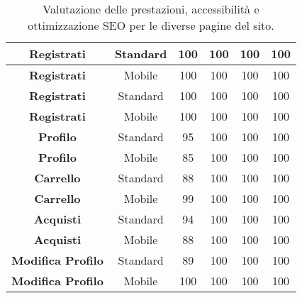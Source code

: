 \begin{table}[H]
\begin{tabular}{|c|c|c|c|c|c|}
        \hline
        \textbf{Registrati} & Standard & 100 & 100 & 100 & 100 \\ 
        \hline
        \rowcolor[gray]{0.9}
        \textbf{Registrati} & Mobile & 100 & 100 & 100 & 100 \\ 
        \hline
        \textbf{Registrati} & Standard & 100 & 100 & 100 & 100 \\ 
        \hline
        \rowcolor[gray]{0.9}
        \textbf{Registrati} & Mobile & 100 & 100 & 100 & 100 \\ 
        \hline
        \textbf{Profilo} & Standard & 95 & 100 & 100 & 100 \\ 
        \hline
        \rowcolor[gray]{0.9}
        \textbf{Profilo} & Mobile & 85 & 100 & 100 & 100 \\ 
        \hline
        \textbf{Carrello} & Standard & 88 & 100 & 100 & 100 \\ 
        \hline
        \rowcolor[gray]{0.9}
        \textbf{Carrello} & Mobile & 99 & 100 & 100 & 100 \\ 
        \hline
        \textbf{Acquisti} & Standard & 94 & 100 & 100 & 100 \\ 
        \hline
        \rowcolor[gray]{0.9}
        \textbf{Acquisti} & Mobile & 88 & 100 & 100 & 100 \\ 
        \hline
        \textbf{Modifica Profilo} & Standard & 89 & 100 & 100 & 100 \\ 
        \hline
        \rowcolor[gray]{0.9}
        \textbf{Modifica Profilo} & Mobile & 100 & 100 & 100 & 100 \\ 
        \hline
    \end{tabular}
    \caption{Valutazione delle prestazioni, accessibilità e ottimizzazione SEO per le diverse pagine del sito.}
    \label{tab:prestazioni}
\end{table}
